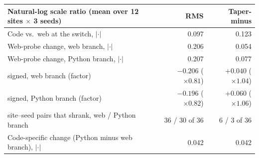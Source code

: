 \begin{tabular}{@{}lrr@{}}
\toprule
Natural-log scale ratio (mean over 12 sites $\times$ 3 seeds) & RMS & Taper-minus \\
\midrule
Code vs.\ web at the switch, $|\cdot|$ & 0.097 & 0.123 \\
Web-probe change, web branch, $|\cdot|$ & 0.206 & 0.054 \\
Web-probe change, Python branch, $|\cdot|$ & 0.207 & 0.077 \\
\quad signed, web branch (factor) & $-0.206$ ($\times0.81$) & ${+}0.040$ ($\times1.04$) \\
\quad signed, Python branch (factor) & $-0.196$ ($\times0.82$) & ${+}0.060$ ($\times1.06$) \\
\quad site--seed pairs that shrank, web / Python branch & 36 / 30 of 36 & 6 / 3 of 36 \\
Code-specific change (Python minus web branch), $|\cdot|$ & 0.042 & 0.042 \\
\bottomrule
\end{tabular}
